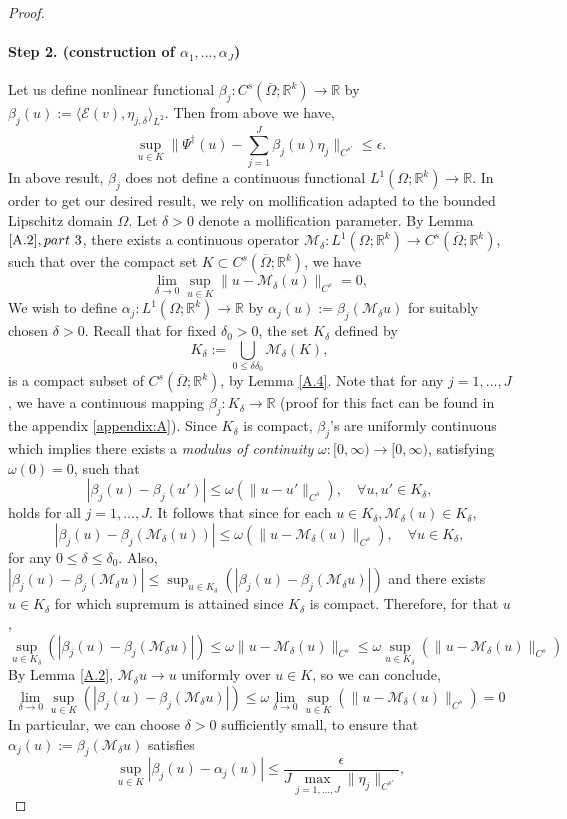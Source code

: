 \documentclass[reqno]{amsart}
\theoremstyle{plain}
\theoremstyle{definition}
\newcommand{\bb}[1]{\mathbb{#1}}
\newcommand{\cal}[1]{\mathcal{#1}}
\begin{document}
\begin{proof}
    \paragraph{\bf Step 2. (construction of $\alpha_1, \dots, \alpha_J$)}
    Let us define nonlinear functional $\beta_j: C^s(\overline{\Omega};\bb R^k) \to \bb R$ by  $\beta_j(u) := \langle \cal E (v),\eta_{j,\delta} \rangle_{L^2}$. Then from above we have,
    $$ \sup\limits_{u \in K}\|\Psi^\dag(u) - \sum_{j=1}^{J}\beta_j(u)\eta_j\|_{C^{s'}} \leq \epsilon.$$
    In above result, $\beta_j$ does not define a continuous functional $L^1(\Omega;\bb R^k) \to \bb R$. In order to get our desired result, we rely on mollification adapted to the bounded Lipschitz domain $\Omega$. Let $\delta > 0$ denote a mollification parameter. By Lemma $\ref{A.2}, part ~3$, there exists a continuous operator $\cal M_\delta : L^1(\Omega;\bb R^k) \to C^s(\overline{\Omega};\bb R^k)$, such that over the compact set $K \subset C^s(\overline{\Omega};\bb R^k)$, we have 
    $$ \lim_{\delta \to 0}\sup\limits_{u \in K}\|u - \cal M_\delta (u)\|_{C^s} = 0,$$
    We wish to define $\alpha_j : L^1(\Omega;\bb R^k) \to \bb R$ by $\alpha_j(u):= \beta_j(\cal M_\delta u)$ for suitably chosen $\delta > 0$. Recall that for fixed $\delta_0 > 0$, the set $K_\delta$ defined by 
    $$ K_\delta := \bigcup\limits_{0\leq\delta\delta_0} \cal M_\delta (K),$$
    is a compact subset of $C^s(\overline{\Omega};\bb R^k)$, by Lemma \ref{A.4}. Note that for any $j = 1, \dots, J$, we have a continuous mapping $\beta_j : K_\delta \to \bb R$ (proof for this fact can be found in the appendix \ref{appendix:A}). Since $K_\delta$ is compact, $\beta_j$'s are uniformly continuous which implies there exists a {\it modulus of continuity} $\omega : [0,\infty) \to [0, \infty)$, satisfying $\omega(0) = 0$, such that
    $$ |\beta_j(u) - \beta_j(u')| \leq \omega(\|u - u'\|_{C^s}), \quad \forall u,u' \in K_\delta,$$
    holds for all $j = 1, \dots, J$. It follows that since for each $u\in K_\delta, \cal M_\delta(u) \in K_\delta$,
    $$|\beta_j(u) - \beta_j(\cal M_\delta(u))| \leq \omega(\|u - \cal M_\delta(u)\|_{C^s}), \quad \forall u \in K_\delta,$$
    for any $0 \leq \delta \leq \delta_0$. Also, $|\beta_j(u) - \beta_j(\cal M_\delta u)| \leq \sup_{u \in K_\delta}(|\beta_j(u) - \beta_j(\cal M_\delta u)|)$ and there exists $u \in K_\delta$ for which supremum is attained since $K_\delta$ is compact. Therefore, for that $u$,
    $$ \sup\limits_{u \in K_\delta}(|\beta_j(u) - \beta_j(\cal M_\delta u)|)\leq \omega \|u - \cal M_\delta (u)\|_{C^s} \leq \omega \sup\limits_{u \in K_\delta} \left(\|u - \cal M_\delta (u)\|_{C^s}\right)$$
    By Lemma \ref{A.2}, $\cal M_\delta u \to u$ uniformly over $u \in K$, so we can conclude,
    $$ \lim_{\delta \to 0} \sup\limits_{u \in K}(|\beta_j(u) - \beta_j(\cal M_\delta u)|) \leq \omega \lim_{\delta \to 0}\sup\limits_{u \in K} \left(\|u - \cal M_\delta (u)\|_{C^s}\right) = 0$$
    In particular, we can choose $\delta > 0$ sufficiently small, to ensure that $\alpha_j(u) := \beta_j(\cal M_\delta u)$ satisfies 
    $$ \sup_{u \in K}|\beta_j(u) - \alpha_j(u)| \leq \frac{\epsilon}{J \max_{j = 1,\dots,J}\|\eta_j\|_{C^{s'}}},$$
\end{proof}
\end{document}
